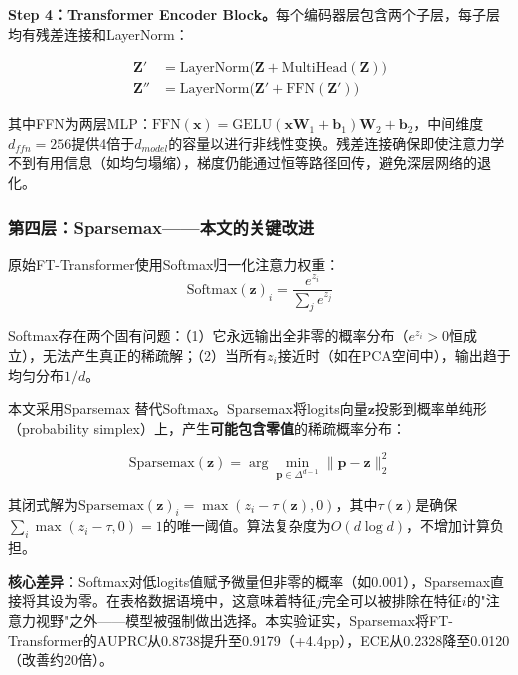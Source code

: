 \textbf{Step 4：Transformer Encoder Block。}每个编码器层包含两个子层，每子层均有残差连接和LayerNorm：

\begin{equation}
\begin{aligned}
\mathbf{Z}' &= \mathrm{LayerNorm}\big(\mathbf{Z} + \mathrm{MultiHead}(\mathbf{Z})\big) \\
\mathbf{Z}'' &= \mathrm{LayerNorm}\big(\mathbf{Z}' + \mathrm{FFN}(\mathbf{Z}')\big)
\end{aligned}
\end{equation}

其中FFN为两层MLP：$\mathrm{FFN}(\mathbf{x}) = \mathrm{GELU}(\mathbf{x}\mathbf{W}_1 + \mathbf{b}_1)\mathbf{W}_2 + \mathbf{b}_2$，中间维度$d_{ffn}=256$提供4倍于$d_{model}$的容量以进行非线性变换。残差连接确保即使注意力学不到有用信息（如均匀塌缩），梯度仍能通过恒等路径回传，避免深层网络的退化。

\subsubsection{第四层：Sparsemax——本文的关键改进}

原始FT-Transformer使用Softmax归一化注意力权重：
\begin{equation}
\mathrm{Softmax}(\mathbf{z})_i = \frac{e^{z_i}}{\sum_j e^{z_j}}
\end{equation}

Softmax存在两个固有问题：（1）它永远输出全非零的概率分布（$e^{z_i} > 0$恒成立），无法产生真正的稀疏解；（2）当所有$z_i$接近时（如在PCA空间中），输出趋于均匀分布$1/d$。

本文采用Sparsemax \cite{martins2016sparsemax}替代Softmax。Sparsemax将logits向量$\mathbf{z}$投影到概率单纯形（probability simplex）上，产生\textbf{可能包含零值}的稀疏概率分布：

\begin{equation}
\mathrm{Sparsemax}(\mathbf{z}) = \arg\min_{\mathbf{p} \in \Delta^{d-1}} \|\mathbf{p} - \mathbf{z}\|_2^2
\end{equation}

其闭式解为$\mathrm{Sparsemax}(\mathbf{z})_i = \max(z_i - \tau(\mathbf{z}), 0)$，其中$\tau(\mathbf{z})$是确保$\sum_i \max(z_i - \tau, 0) = 1$的唯一阈值。算法复杂度为$O(d \log d)$，不增加计算负担。

\textbf{核心差异}：Softmax对低logits值赋予微量但非零的概率（如0.001），Sparsemax直接将其设为零。在表格数据语境中，这意味着特征$j$完全可以被排除在特征$i$的"注意力视野"之外——模型被强制做出选择。本实验证实，Sparsemax将FT-Transformer的AUPRC从0.8738提升至0.9179（+4.4pp），ECE从0.2328降至0.0120（改善约20倍）。

